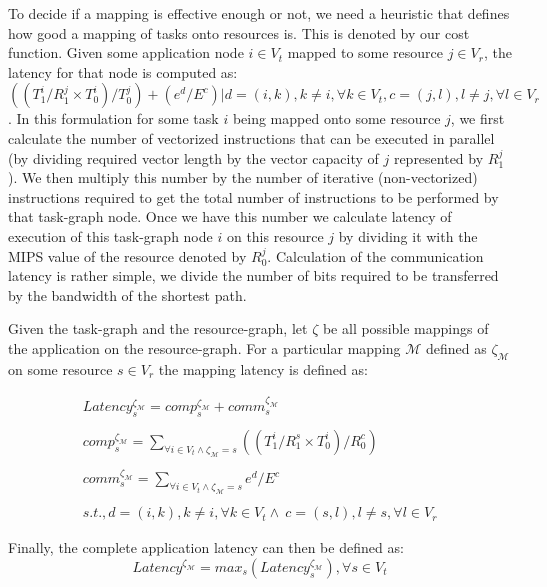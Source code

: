 \documentclass[10pt, conference, compsocconf]{IEEEtran}
\begin{document}
To decide if a mapping is effective enough or not, we need a heuristic
that defines how good a mapping of tasks onto resources is. This is
denoted by our cost function. Given some application node $i \in V_t$
mapped to some resource $j \in V_r$, the latency for that node is
computed as: $((T^i_1/R^j_1\times T^i_0)/T^j_0) + (e^d/E^c) | d = (i,k),
k \neq i, \forall k \in V_t, c = (j,l), l \neq j, \forall l \in V_r
$. In this formulation for some task $i$ being mapped onto some resource
$j$, we first calculate the number of vectorized instructions that can
be executed in parallel (by dividing required vector length by the
vector capacity of $j$ represented by $R^j_1$). We then multiply this
number by the number of iterative (non-vectorized) instructions required
to get the total number of instructions to be performed by that
task-graph node. Once we have this number we calculate latency of
execution of this task-graph node $i$ on this resource $j$ by dividing
it with the MIPS value of the resource denoted by $R^j_0$. Calculation
of the communication latency is rather simple, we divide the number of
bits required to be transferred by the bandwidth of the shortest path.

Given the task-graph and the resource-graph, let $\zeta$ be all possible
mappings of the application on the resource-graph. For a particular
mapping $\mathcal{M}$ defined as $\zeta_\mathcal{M}$ on some resource $s
\in V_r$ the mapping latency is defined as:

\begin{equation}
  \begin{array}{c}
    Latency^{\zeta_\mathcal{M}}_s = comp^{\zeta_\mathcal{M}}_s +
comm^{\zeta_\mathcal{M}}_s\\
	\\comp^{\zeta_\mathcal{M}}_s = 
    \sum_{\forall i \in V_t \wedge
      \zeta_\mathcal{M} = s} ((T^i_1/R^s_1\times T^i_0)/R^c_0)\\
    \\comm^{\zeta_\mathcal{M}}_s =
    \sum_{\forall i \in V_t \wedge
      \zeta_\mathcal{M} = s} e^d / E^c\\ 
    \\s.t., d = (i,k), k \neq i, \forall k
    \in V_t \wedge\  c = (s,l), l \neq s, \forall l \in V_r
  \end{array}
  \label{eq:1}
\end{equation}

Finally, the complete application latency can then be defined as: 
\begin{equation}
  \label{eq:2}
  Latency^{\zeta_\mathcal{M}} = max_{s}
  ({Latency^{\zeta_\mathcal{M}}_s}), \forall s \in V_t
\end{equation}
\end{document}
